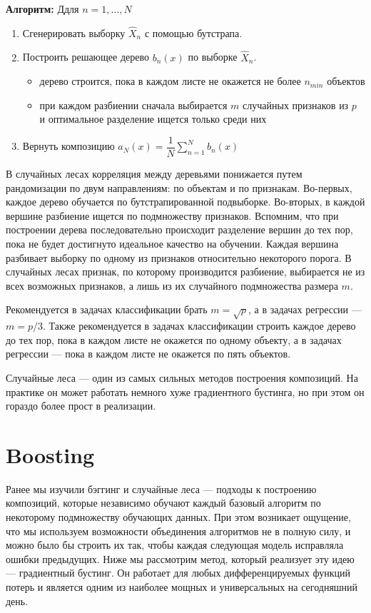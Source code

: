 \documentclass{article}
\theoremstyle{definition}
\theoremstyle{theorem}
\theoremstyle{remark}
\theoremstyle{theorem}
\theoremstyle{example}
\theoremstyle{theorem}
\theoremstyle{theorem}
\theoremstyle{theorem}
\theoremstyle{theorem}
\begin{document}
\textbf{Алгоритм:}
Ддля $n=1,\ldots,N$
\begin{enumerate}
	\item Сгенерировать выборку $\hat{X}_n$ с помощью бутстрапа.
	\item Построить решающее дерево $b_n(x)$ по выборке $\hat{X}_n$.
	\begin{itemize}
		\item дерево строится, пока в каждом листе не окажется не более $n_{min}$ объектов
		\item при каждом разбиении сначала выбирается $m$ случайных признаков из $p$ и оптимальное разделение ищется только среди них
	\end{itemize}
	\item Вернуть композицию $a_N(x) = \dfrac{1}{N}\sum_{n=1}^{N}b_n(x)$
\end{enumerate}

В случайных лесах корреляция между деревьями понижается путем рандомизации по двум направлениям: по объектам и по признакам. Во-первых, каждое дерево обучается по бутстрапированной подвыборке. Во-вторых, в каждой вершине разбиение ищется по подмножеству признаков. Вспомним, что при построении дерева последовательно происходит разделение вершин до тех пор, пока не будет достигнуто идеальное качество на обучении. Каждая вершина разбивает выборку по одному из признаков относительно некоторого порога. В случайных лесах признак, по которому производится разбиение, выбирается не из всех возможных признаков, а лишь из их случайного подмножества размера $m$.

Рекомендуется в задачах классификации брать $m=\sqrt{p}$, а в задачах регрессии --- $m=p/3$. Также рекомендуется в задачах классификации строить каждое дерево до тех пор, пока в каждом листе не окажется по одному объекту, а в задачах регрессии — пока в каждом листе не окажется по пять объектов. 

Случайные леса --- один из самых сильных методов построения композиций. На практике он может работать немного хуже градиентного бустинга, но при этом он гораздо более прост в реализации.

\section{Boosting}

Ранее мы изучили бэггинг и случайные леса — подходы к построению композиций, которые независимо обучают каждый базовый алгоритм по некоторому подмножеству обучающих данных. При этом возникает ощущение, что мы используем
возможности объединения алгоритмов не в полную силу, и можно было бы строить их так, чтобы каждая следующая модель исправляла ошибки предыдущих. Ниже мы рассмотрим метод, который реализует эту идею — градиентный бустинг. Он работает для любых дифференцируемых функций потерь и является одним из наиболее мощных и универсальных на сегодняшний день.
\end{document}
